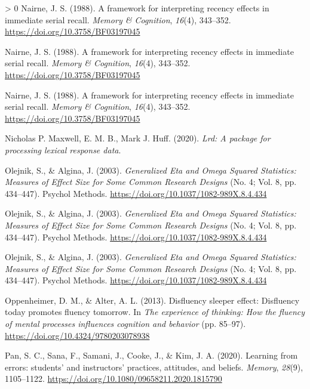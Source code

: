 \documentclass[
  english,
  jou]{apa7}
\newlength{\cslhangindent}
\newenvironment{CSLReferences}[3] %
 {%
  \setlength{\parindent}{0pt}
  \ifodd #1 \everypar{\setlength{\hangindent}{\cslhangindent}}\ignorespaces\fi
  \ifnum #2 > 0
  \setlength{\parskip}{#2\baselineskip}
  \fi
 }%
 {}
\begin{document}
\begin{CSLReferences}{1}{0}
\leavevmode\hypertarget{ref-Nairne1988}{}%
Nairne, J. S. (1988). {A framework for interpreting recency effects in immediate serial recall}. \emph{Memory {\&} Cognition}, \emph{16}(4), 343--352. \url{https://doi.org/10.3758/BF03197045}

\leavevmode\hypertarget{ref-Nairne1988}{}%
Nairne, J. S. (1988). {A framework for interpreting recency effects in immediate serial recall}. \emph{Memory {\&} Cognition}, \emph{16}(4), 343--352. \url{https://doi.org/10.3758/BF03197045}

\leavevmode\hypertarget{ref-Nairne1988}{}%
Nairne, J. S. (1988). {A framework for interpreting recency effects in immediate serial recall}. \emph{Memory {\&} Cognition}, \emph{16}(4), 343--352. \url{https://doi.org/10.3758/BF03197045}

\leavevmode\hypertarget{ref-Maxwell2020}{}%
Nicholas P. Maxwell, E. M. B., Mark J. Huff. (2020). \emph{Lrd: A package for processing lexical response data}.

\leavevmode\hypertarget{ref-Olejnik2003}{}%
Olejnik, S., \& Algina, J. (2003). \emph{{Generalized Eta and Omega Squared Statistics: Measures of Effect Size for Some Common Research Designs}} (No. 4; Vol. 8, pp. 434--447). Psychol Methods. \url{https://doi.org/10.1037/1082-989X.8.4.434}

\leavevmode\hypertarget{ref-Olejnik2003}{}%
Olejnik, S., \& Algina, J. (2003). \emph{{Generalized Eta and Omega Squared Statistics: Measures of Effect Size for Some Common Research Designs}} (No. 4; Vol. 8, pp. 434--447). Psychol Methods. \url{https://doi.org/10.1037/1082-989X.8.4.434}

\leavevmode\hypertarget{ref-Olejnik2003}{}%
Olejnik, S., \& Algina, J. (2003). \emph{{Generalized Eta and Omega Squared Statistics: Measures of Effect Size for Some Common Research Designs}} (No. 4; Vol. 8, pp. 434--447). Psychol Methods. \url{https://doi.org/10.1037/1082-989X.8.4.434}

\leavevmode\hypertarget{ref-Oppenheimer2013}{}%
Oppenheimer, D. M., \& Alter, A. L. (2013). {Disfluency sleeper effect: Disfluency today promotes fluency tomorrow}. In \emph{The experience of thinking: How the fluency of mental processes influences cognition and behavior} (pp. 85--97). \url{https://doi.org/10.4324/9780203078938}

\leavevmode\hypertarget{ref-Pan2020}{}%
Pan, S. C., Sana, F., Samani, J., Cooke, J., \& Kim, J. A. (2020). {Learning from errors: students' and instructors' practices, attitudes, and beliefs}. \emph{Memory}, \emph{28}(9), 1105--1122. \url{https://doi.org/10.1080/09658211.2020.1815790}


\end{CSLReferences}
\end{document}
